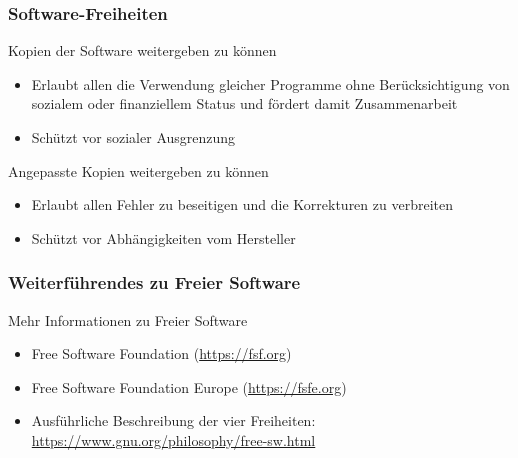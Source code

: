 \documentclass{beamer}
\begin{document}
\begin{frame}
  \frametitle{Software-Freiheiten}

  \onslide<+->

  \begin{block}{Kopien der Software weitergeben zu können}
    \begin{itemize}
    \item Erlaubt allen die Verwendung gleicher Programme ohne Berücksichtigung
      von sozialem oder finanziellem Status und fördert damit Zusammenarbeit
    \item Schützt vor sozialer Ausgrenzung
    \end{itemize}
  \end{block}

  \onslide<+->

  \begin{block}{Angepasste Kopien weitergeben zu können}
    \begin{itemize}
    \item Erlaubt allen Fehler zu beseitigen und die Korrekturen zu verbreiten
    \item Schützt vor Abhängigkeiten vom Hersteller
    \end{itemize}
  \end{block}
\end{frame}

\begin{frame}
  \frametitle{Weiterführendes zu Freier Software}

  \onslide<+->

  \begin{block}{Mehr Informationen zu Freier Software}
    \begin{itemize}
    \item Free Software Foundation (\url{https://fsf.org})
    \item Free Software Foundation Europe (\url{https://fsfe.org})
    \item Ausführliche Beschreibung der vier Freiheiten:
      \url{https://www.gnu.org/philosophy/free-sw.html}
    \end{itemize}
  \end{block}

\end{frame}
\end{document}
